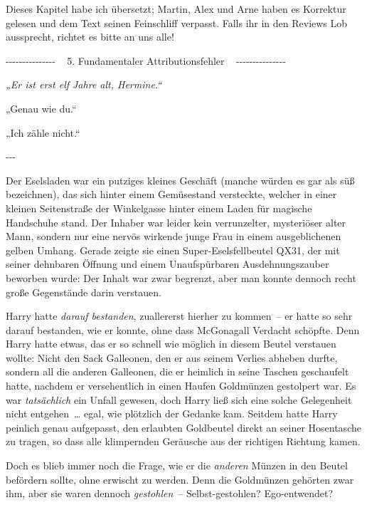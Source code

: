 

\hypertarget{fundamentaler-attributionsfehler}{%

Dieses Kapitel habe ich übersetzt; Martin, Alex und Arne haben es Korrektur gelesen und dem Text seinen Feinschliff verpasst. Falls ihr in den Reviews Lob aussprecht, richtet es bitte an uns alle!

-\/-\/-\/-\/-\/-\/-\/-\/-\/-\/-\/-\/-\/-\/- ~ 5. Fundamentaler Attributionsfehler ~ -\/-\/-\/-\/-\/-\/-\/-\/-\/-\/-\/-\/-\/-\/-

\emph{„Er ist erst elf Jahre alt, Hermine.“}

„Genau wie du.“

„Ich zähle nicht.“

-\/-\/-

Der Eselsladen war ein putziges kleines Geschäft (manche würden es gar als süß bezeichnen), das sich hinter einem Gemüsestand versteckte, welcher in einer kleinen Seitenstraße der Winkelgasse hinter einem Laden für magische Handschuhe stand. Der Inhaber war leider kein verrunzelter, mysteriöser alter Mann, sondern nur eine nervös wirkende junge Frau in einem ausgeblichenen gelben Umhang. Gerade zeigte sie einen Super-Eselsfellbeutel QX31, der mit seiner dehnbaren Öffnung und einem Unaufspürbaren Ausdehnungszauber beworben wurde: Der Inhalt war zwar begrenzt, aber man konnte dennoch recht große Gegenstände darin verstauen.

Harry hatte \emph{darauf bestanden}, zuallererst hierher zu kommen~-- er hatte so sehr darauf bestanden, wie er konnte, ohne dass McGonagall Verdacht schöpfte. Denn Harry hatte etwas, das er so schnell wie möglich in diesem Beutel verstauen wollte: Nicht den Sack Galleonen, den er aus seinem Verlies abheben durfte, sondern all die anderen Galleonen, die er heimlich in seine Taschen geschaufelt hatte, nachdem er versehentlich in einen Haufen Goldmünzen gestolpert war. Es war \emph{tatsächlich} ein Unfall gewesen, doch Harry ließ sich eine solche Gelegenheit nicht entgehen~… egal, wie plötzlich der Gedanke kam. Seitdem hatte Harry peinlich genau aufgepasst, den erlaubten Goldbeutel direkt an seiner Hosentasche zu tragen, so dass alle klimpernden Geräusche aus der richtigen Richtung kamen.

Doch es blieb immer noch die Frage, wie er die \emph{anderen} Münzen in den Beutel befördern sollte, ohne erwischt zu werden. Denn die Goldmünzen gehörten zwar ihm, aber sie waren dennoch \emph{gestohlen}~-- Selbst-gestohlen? Ego-entwendet?

}
